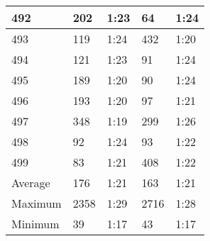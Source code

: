 \begin{center}
\begin{longtable}{|p{2cm}|l|l|l|l|}
492	&   202           &  1:23  &		64      	& 1:24 \\ \hline
493	&   119           &  1:24  &		432     	& 1:20 \\ \hline
494	&   121           &  1:23  &		91      	& 1:24 \\ \hline
495	&   189           &  1:20  &		90      	& 1:24 \\ \hline
496	&   193           &  1:20  &		97      	& 1:21 \\ \hline
497	&   348           &  1:19  &		299     	& 1:26 \\ \hline
498	&   92            &  1:24  &		93      	& 1:22 \\ \hline
499	&   83            &  1:21  &		408     	& 1:22 \\ \hline
Average	& 176         &  1:21  &  		163         & 1:21 \\ \hline
Maximum	& 2358        &  1:29  &        2716        & 1:28 \\ \hline
Minimum	& 39          &  1:17  &        43	        & 1:17 \\ \hline

		\hline
	\end{longtable}
\end{center}